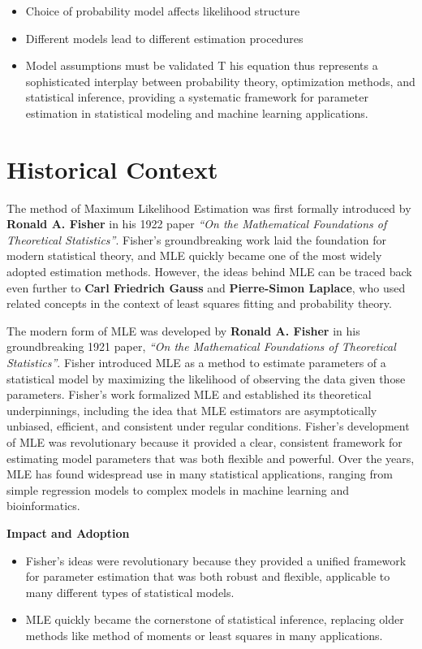 \documentclass[
  12 pt,
  a4paper,
]{book}
\providecommand{\tightlist}{%
  \setlength{\itemsep}{0pt}\setlength{\parskip}{0pt}}
\numberwithin{equation}{section}
\theoremstyle{plain}      %
\theoremstyle{definition} %
\theoremstyle{remark}     %
\theoremstyle{note}         %
\begin{document}
\begin{itemize}
\tightlist
\item
  Choice of probability model affects likelihood structure
\item
  Different models lead to different estimation procedures
\item
  Model assumptions must be validated T his equation thus represents a
  sophisticated interplay between probability theory, optimization
  methods, and statistical inference, providing a systematic framework
  for parameter estimation in statistical modeling and machine learning
  applications.
\end{itemize}

\hypertarget{historical-context-3}{%
\section{Historical Context}\label{historical-context-3}}

The method of Maximum Likelihood Estimation was first formally
introduced by \textbf{Ronald A. Fisher} in his 1922 paper \emph{``On the
Mathematical Foundations of Theoretical Statistics''}. Fisher's
groundbreaking work laid the foundation for modern statistical theory,
and MLE quickly became one of the most widely adopted estimation
methods. However, the ideas behind MLE can be traced back even further
to \textbf{Carl Friedrich Gauss} and \textbf{Pierre-Simon Laplace}, who
used related concepts in the context of least squares fitting and
probability theory.

The modern form of MLE was developed by \textbf{Ronald A. Fisher} in his
groundbreaking 1921 paper, \emph{``On the Mathematical Foundations of
Theoretical Statistics''}. Fisher introduced MLE as a method to estimate
parameters of a statistical model by maximizing the likelihood of
observing the data given those parameters. Fisher's work formalized MLE
and established its theoretical underpinnings, including the idea that
MLE estimators are asymptotically unbiased, efficient, and consistent
under regular conditions. Fisher's development of MLE was revolutionary
because it provided a clear, consistent framework for estimating model
parameters that was both flexible and powerful. Over the years, MLE has
found widespread use in many statistical applications, ranging from
simple regression models to complex models in machine learning and
bioinformatics.

\textbf{Impact and Adoption}

\begin{itemize}
\tightlist
\item
  Fisher's ideas were revolutionary because they provided a unified
  framework for parameter estimation that was both robust and flexible,
  applicable to many different types of statistical models.
\item
  MLE quickly became the cornerstone of statistical inference, replacing
  older methods like method of moments or least squares in many
  applications.
\end{itemize}
\end{document}
